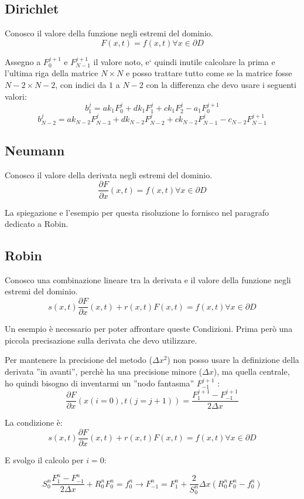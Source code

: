 \documentclass[]{article}
\newcommand{\pde}[2]{\ensuremath{\frac{\partial #1}{\partial #2}}}
\newcommand{\lr}[3]{\ensuremath{\left#1 #3 \right#2}}
\newcommand{\lrt}[1]{\lr{(}{)}{#1}}
\numberwithin{equation}{subsection}
\begin{document}
\subsection{Dirichlet}
Conosco il valore della funzione negli estremi del dominio.
$$F(x,t) = f(x,t) \forall x \in \partial D$$

Assegno a $F_0^{j+1}$ e $F_{N-1}^{j+1}$ il valore noto, e` quindi inutile calcolare la prima e l'ultima riga della matrice $N\times N$ e posso trattare tutto come se la matrice fosse $N-2\times N-2$, con indici da $1$ a $N-2$ con la differenza che devo usare i seguenti valori:
$$b_1^j = ak_1 F_{0}^{j}+ dk_1 F_{1}^{j} + ck_1 F_{2}^{j} - a_1 F_0^{j+1} $$
$$b_{N-2}^j = ak_{N-2} F_{N-3}^{j}+ dk_{N-2} F_{N-2}^{j} + ck_{N-2} F_{N-1}^{j} - c_{N-2} F_{N-1}^{j+1} $$
\subsection{Neumann}
Conosco il valore della derivata negli estremi del dominio.
$$\pde Fx(x,t) = f(x,t) \forall x \in \partial D$$

La spiegazione e l'esempio per questa risoluzione lo fornisco nel paragrafo dedicato a Robin.

\subsection{Robin}
Conosco una combinazione lineare tra la derivata e il valore della funzione negli estremi del dominio.
$$s(x,t)\pde Fx(x,t) +r(x,t) F(x,t) = f(x,t) \forall x \in \partial D$$

Un esempio \`e necessario per poter affrontare queste Condizioni. Prima per\`o una piccola precisazione sulla derivata che devo utilizzare.

Per mantenere la precisione del metodo ($\Delta x^2$) non posso usare la definizione della derivata ''in avanti'', perch\`e ha una precisione minore ($\Delta x$), ma quella centrale,  ho quindi bisogno di inventarmi un ''nodo fantasma'' $F_{-1}^{j+1}$ :
$$\pde Fx(x(i=0),t(j=j+1)) = \frac{F_{1}^{j+1}-F_{-1}^{j+1}}{2\Delta x}$$

La condizione \`e:
$$s(x,t)\pde Fx(x,t) +r(x,t) F(x,t) = f(x,t) \forall x \in \partial D$$

E svolgo il calcolo per $i=0$:

$$S_0^n\frac{F_{1}^{n}-F_{-1}^{n}}{2\Delta x} + R_0^nF_{0}^{n} = f_0^n  \to 
F_{-1}^{n} = F_{1}^{n} + \frac 2{S_0^n}\Delta x \lrt{R_0^nF_{0}^{n}-f^n_0}$$
\end{document}
